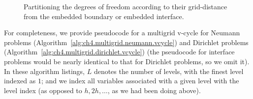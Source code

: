 \setlength{\figurewidth}{0.50\textwidth}
\begin{figure}[htbp]
\centering
{}
\caption{Partitioning the degrees of freedom according to their grid-distance from the embedded boundary or embedded interface.}
\label{fig:ch4.multigrid.boundaryinterfacedistance}
\end{figure}

For completeness, we provide pseudocode for a multigrid v-cycle for Neumann problems (Algorithm~\ref{alg:ch4.multigrid.neumann.vcycle}) and Dirichlet problems (Algorithm~\ref{alg:ch4.multigrid.dirichlet.vcycle}) (the pseudocode for interface problems would be nearly identical to that for Dirichlet problems, so we omit it). In these algorithm listings, $L$ denotes the number of levels, with the finest level indexed as $1$; and we index all variables associated with a given level with the level index (as opposed to $h, 2h, \dotsc$, as we had been doing above).

